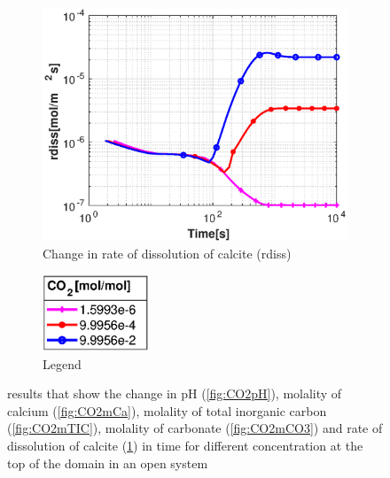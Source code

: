 \begin{figure}[!h]
\begin{subfigure}{.5\linewidth}
            \centering
        \includegraphics[width=\textwidth]{PICTURES/with_CO2_rdiss.eps}
        \caption{Change in rate of dissolution of calcite (rdiss)}
        \label{fig:CO2rdiss}
    \end{subfigure}%
    \hfill
    \begin{subfigure}{.5\linewidth}
            \centering
        \includegraphics[width=0.35\textwidth]{PICTURES/with_CO2_legend.eps}
        \caption{Legend}
        \label{fig:CO2legend}
    \end{subfigure}%
    \caption{\DuMuX results that show the change in pH (\cref{fig:CO2pH}), molality of calcium (\cref{fig:CO2mCa}), 
    molality of total inorganic carbon (\cref{fig:CO2mTIC}), molality of carbonate (\cref{fig:CO2mCO3}) and rate of 
    dissolution of calcite (\cref{fig:CO2rdiss}) in time for different  concentration at the top of the domain in an open system}
    \label{fig:diffCO2}
\end{figure}

